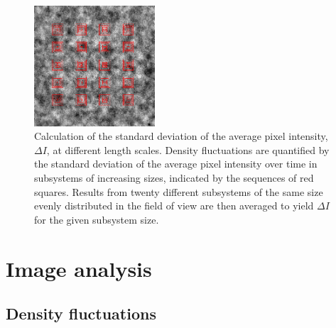 \documentclass[twocolumn,aps,prx,amsmath,amssymb,longbibliography,superscriptaddress]{revtex4-2}
\begin{document}
\begin{figure}[t]
	\begin{center}
		\includegraphics[width=0.4\textwidth]{Figures/fig-7.pdf}
		\caption[GNF calculations]
		{Calculation of the standard deviation of the average pixel intensity, $\Delta I$, at different length scales. Density fluctuations are quantified by the standard deviation of the average pixel intensity over time in subsystems of increasing sizes, indicated by the sequences of red squares. Results from twenty different subsystems of the same size evenly distributed in the field of view are then averaged to yield $\Delta I$ for the given subsystem size.}
		\label{GNF-calculation}
	\end{center}
\end{figure}


\section{Image analysis} \label{appendix-IA}
\subsection{Density fluctuations} \label{sec:GNF-calculations}
\end{document}
